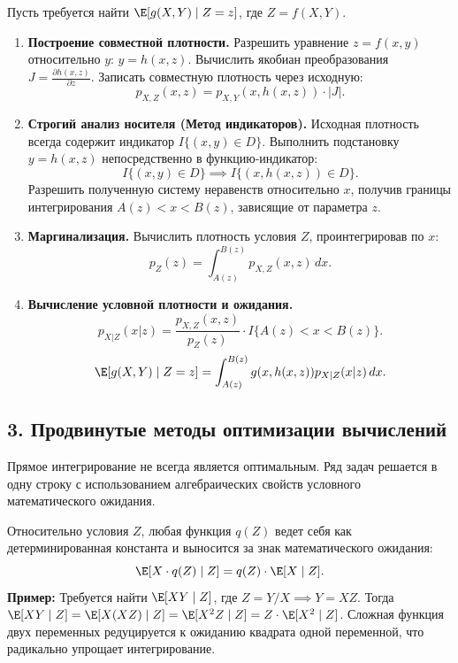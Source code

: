\begin{MethodBox}
Пусть требуется найти $\E[g(X,Y) \mid Z=z]$, где $Z = f(X,Y)$.

\begin{enumerate}[label=\textbf{\arabic*.}]
    \item \textbf{Построение совместной плотности.} Разрешить уравнение $z = f(x,y)$ относительно $y$: $y = h(x,z)$. Вычислить якобиан преобразования $J = \frac{\partial h(x,z)}{\partial z}$.
    Записать совместную плотность через исходную:
    \[
        p_{X,Z}(x,z) = p_{X,Y}(x, h(x,z)) \cdot |J|.
    \]
    
    \item \textbf{Строгий анализ носителя (Метод индикаторов).} Исходная плотность всегда содержит индикатор $I\{(x,y) \in D\}$. Выполнить подстановку $y = h(x,z)$ непосредственно в функцию-индикатор:
    \[
        I\{(x, y) \in D\} \implies I\{(x, h(x,z)) \in D\}.
    \]
    Разрешить полученную систему неравенств относительно $x$, получив границы интегрирования $A(z) < x < B(z)$, зависящие от параметра $z$.
    
    \item \textbf{Маргинализация.} Вычислить плотность условия $Z$, проинтегрировав по $x$:
    \[
        p_Z(z) = \int_{A(z)}^{B(z)} p_{X,Z}(x,z) \, dx.
    \]
    
    \item \textbf{Вычисление условной плотности и ожидания.} 
    \[
        p_{X|Z}(x|z) = \frac{p_{X,Z}(x,z)}{p_Z(z)} \cdot I\{A(z) < x < B(z)\}.
    \]
    \[
        \E[g(X,Y) \mid Z=z] = \int_{A(z)}^{B(z)} g(x, h(x,z)) p_{X|Z}(x|z) \, dx.
    \]
\end{enumerate}
\end{MethodBox}

\vspace{1em}

\subsection*{3. Продвинутые методы оптимизации вычислений}

Прямое интегрирование не всегда является оптимальным. Ряд задач решается в одну строку с использованием алгебраических свойств условного математического ожидания.

\begin{HackBox}
Относительно условия $Z$, любая функция $q(Z)$ ведет себя как детерминированная константа и выносится за знак математического ожидания:
\[
    \E[X \cdot q(Z) \mid Z] = q(Z) \cdot \E[X \mid Z].
\]
\textbf{Пример:} Требуется найти $\E[XY \mid Z]$, где $Z = Y/X \implies Y = XZ$.
Тогда $\E[XY \mid Z] = \E[X(XZ) \mid Z] = \E[X^2 Z \mid Z] = Z \cdot \E[X^2 \mid Z]$. 
Сложная функция двух переменных редуцируется к ожиданию квадрата одной переменной, что радикально упрощает интегрирование.
\end{HackBox}

